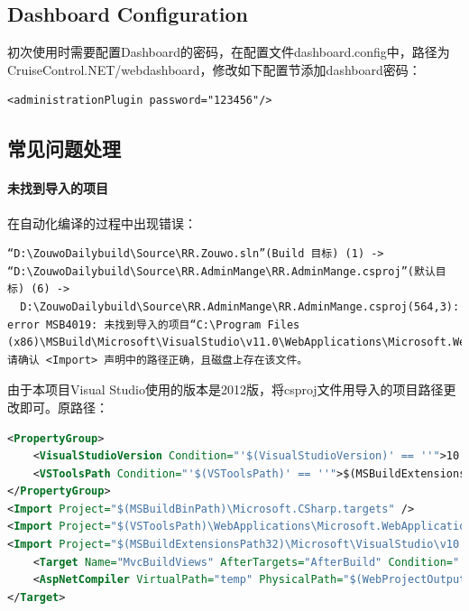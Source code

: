 \documentclass{book}
\begin{document}
\subsection{Dashboard Configuration}

初次使用时需要配置Dashboard的密码，在配置文件dashboard.config中，路径为CruiseControl.NET/webdashboard，修改如下配置节添加dashboard密码：
\begin{lstlisting}
<administrationPlugin password="123456"/>
\end{lstlisting}

\subsection{常见问题处理}

\paragraph{未找到导入的项目}在自动化编译的过程中出现错误：

\begin{lstlisting}
“D:\ZouwoDailybuild\Source\RR.Zouwo.sln”(Build 目标) (1) ->
“D:\ZouwoDailybuild\Source\RR.AdminMange\RR.AdminMange.csproj”(默认目标) (6) ->
  D:\ZouwoDailybuild\Source\RR.AdminMange\RR.AdminMange.csproj(564,3): error MSB4019: 未找到导入的项目“C:\Program Files (x86)\MSBuild\Microsoft\VisualStudio\v11.0\WebApplications\Microsoft.WebApplication.targets”。请确认 <Import> 声明中的路径正确，且磁盘上存在该文件。
\end{lstlisting}

由于本项目Visual Studio使用的版本是2012版，将csproj文件用导入的项目路径更改即可。原路径：

\begin{lstlisting}[language=XML]
<PropertyGroup>
	<VisualStudioVersion Condition="'$(VisualStudioVersion)' == ''">10.0</VisualStudioVersion>
	<VSToolsPath Condition="'$(VSToolsPath)' == ''">$(MSBuildExtensionsPath32)\Microsoft\VisualStudio\v$(VisualStudioVersion)</VSToolsPath>
</PropertyGroup>
<Import Project="$(MSBuildBinPath)\Microsoft.CSharp.targets" />
<Import Project="$(VSToolsPath)\WebApplications\Microsoft.WebApplication.targets" Condition="'$(VSToolsPath)' != ''" />
<Import Project="$(MSBuildExtensionsPath32)\Microsoft\VisualStudio\v10.0\WebApplications\Microsoft.WebApplication.targets" Condition="false" />
	<Target Name="MvcBuildViews" AfterTargets="AfterBuild" Condition="'$(MvcBuildViews)'=='true'">
	<AspNetCompiler VirtualPath="temp" PhysicalPath="$(WebProjectOutputDir)" />
</Target>
\end{lstlisting}
\end{document}
